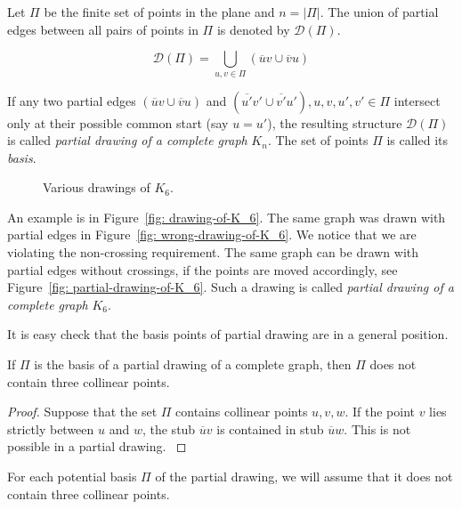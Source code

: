 \begin{definition}
Let $\Pi$ be the finite set of points in the plane and $n = |\Pi|$. The union of partial edges between all pairs of points in $\Pi$ is denoted by $\mathcal{D}(\Pi)$.

\begin{equation}
\mathcal{D}(\Pi) = \bigcup_{u,v \in \Pi} (\overline{u}v \cup \overline{v}u)
\end{equation}

If any two partial edges $(\overline{u}v \cup \overline{v}u)$ and $(\overline{u'}v' \cup \overline{v'}u'), u,v,u',v' \in \Pi$ intersect only at their possible common start (say $u = u'$), the resulting structure $\mathcal{D}(\Pi)$ is called \textit{partial drawing of a complete graph} $K_{n}$. The set of points $\Pi$ is called its \textit{basis}.
\label{def: partial-drawing}
\end{definition}

\begin{figure}
\centering

\caption{Various drawings of $K_{6}$.}
\label{fig: drawings-of-K6}
\end{figure}

An example is in Figure~\ref{fig: drawing-of-K_6}. The same graph was drawn with partial edges in Figure~\ref{fig: wrong-drawing-of-K_6}. We notice that we are violating the non-crossing requirement. The same graph can be drawn with partial edges without crossings, if the points are moved accordingly, see Figure~\ref{fig: partial-drawing-of-K_6}. Such a drawing is called \textit{partial drawing of a complete graph} $K_{6}$.

It is easy check that the basis points of partial drawing are in a general position.
\begin{lemma}
If $\Pi$ is the basis of a partial drawing of a complete graph, then $\Pi$ does not contain three collinear points.
\end{lemma}
\begin{proof}
Suppose that the set $\Pi$ contains collinear points $u, v, w$. If the point $v$ lies strictly between $u$ and $w$, the stub $\overline{u}v$ is contained in stub $\overline{u}w$. This is not possible in a partial drawing.
\label{lemma: non-linearity}
\end{proof}

For each potential basis $\Pi$ of the partial drawing, we will assume that it does not contain three collinear points.

